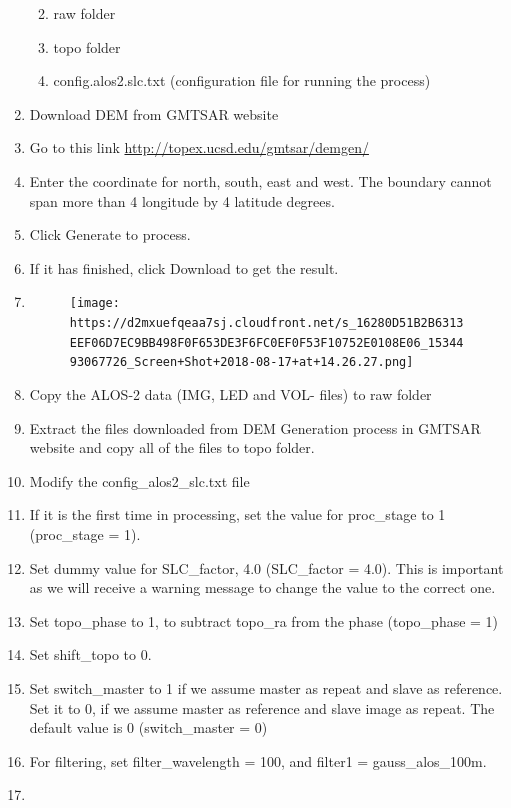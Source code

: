 \documentclass[]{book}
\providecommand{\tightlist}{%
  \setlength{\itemsep}{0pt}\setlength{\parskip}{0pt}}
\theoremstyle{definition}
\theoremstyle{definition}
\theoremstyle{definition}
\theoremstyle{remark}
\begin{document}
\begin{enumerate}
  \begin{enumerate}
  \def\labelenumii{\arabic{enumii}.}
  \tightlist
  \item
    raw folder
  \item
    topo folder
  \item
    config.alos2.slc.txt (configuration file for running the process)
  \end{enumerate}
\item
  Download DEM from GMTSAR website
\item
  Go to this link \url{http://topex.ucsd.edu/gmtsar/demgen/}
\item
  Enter the coordinate for north, south, east and west. The boundary
  cannot span more than 4 longitude by 4 latitude degrees.
\item
  Click Generate to process.
\item
  If it has finished, click Download to get the result.
\item
  \begin{figure}
  \centering
  \texttt{[image: https://d2mxuefqeaa7sj.cloudfront.net/s\_16280D51B2B6313EEF06D7EC9BB498F0F653DE3F6FC0EF0F53F10752E0108E06\_1534493067726\_Screen+Shot+2018-08-17+at+14.26.27.png]}
  \caption{}
  \end{figure}
\item
  Copy the ALOS-2 data (IMG, LED and VOL- files) to raw folder
\item
  Extract the files downloaded from DEM Generation process in GMTSAR
  website and copy all of the files to topo folder.
\item
  Modify the config\_alos2\_slc.txt file
\item
  If it is the first time in processing, set the value for proc\_stage
  to 1 (proc\_stage = 1).
\item
  Set dummy value for SLC\_factor, 4.0 (SLC\_factor = 4.0). This is
  important as we will receive a warning message to change the value to
  the correct one.
\item
  Set topo\_phase to 1, to subtract topo\_ra from the phase (topo\_phase
  = 1)
\item
  Set shift\_topo to 0.
\item
  Set switch\_master to 1 if we assume master as repeat and slave as
  reference. Set it to 0, if we assume master as reference and slave
  image as repeat. The default value is 0 (switch\_master = 0)
\item
  For filtering, set filter\_wavelength = 100, and filter1 =
  gauss\_alos\_100m.
\item

\end{enumerate}
\end{document}

